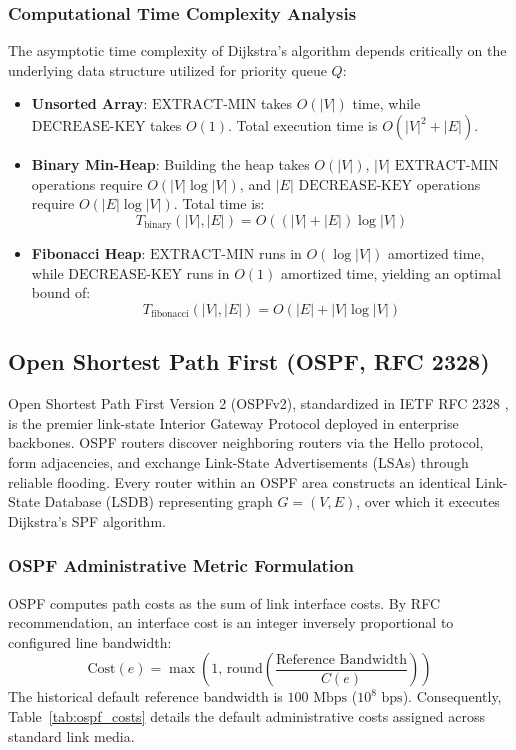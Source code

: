 \documentclass[12pt,a4paper,oneside]{report}
\begin{document}
\subsubsection{Computational Time Complexity Analysis}
The asymptotic time complexity of Dijkstra's algorithm depends critically on the underlying data structure utilized for priority queue $Q$:
\begin{itemize}
    \item \textbf{Unsorted Array}: $\text{EXTRACT-MIN}$ takes $O(|V|)$ time, while $\text{DECREASE-KEY}$ takes $O(1)$. Total execution time is $O(|V|^2 + |E|)$.
    \item \textbf{Binary Min-Heap}: Building the heap takes $O(|V|)$, $|V|$ $\text{EXTRACT-MIN}$ operations require $O(|V| \log |V|)$, and $|E|$ $\text{DECREASE-KEY}$ operations require $O(|E| \log |V|)$. Total time is:
    \begin{equation}
        T_{\text{binary}}(|V|, |E|) = O((|V| + |E|) \log |V|)
    \end{equation}
    \item \textbf{Fibonacci Heap}: $\text{EXTRACT-MIN}$ runs in $O(\log |V|)$ amortized time, while $\text{DECREASE-KEY}$ runs in $O(1)$ amortized time, yielding an optimal bound of:
    \begin{equation}
        T_{\text{fibonacci}}(|V|, |E|) = O(|E| + |V| \log |V|)
    \end{equation}
\end{itemize}

\subsection{Open Shortest Path First (OSPF, RFC 2328)}
Open Shortest Path First Version 2 (OSPFv2), standardized in IETF RFC 2328 \cite{moy1998ospf}, is the premier link-state Interior Gateway Protocol deployed in enterprise backbones. OSPF routers discover neighboring routers via the Hello protocol, form adjacencies, and exchange Link-State Advertisements (LSAs) through reliable flooding. Every router within an OSPF area constructs an identical Link-State Database (LSDB) representing graph $G = (V, E)$, over which it executes Dijkstra's SPF algorithm.

\subsubsection{OSPF Administrative Metric Formulation}
OSPF computes path costs as the sum of link interface costs. By RFC recommendation, an interface cost is an integer inversely proportional to configured line bandwidth:
\begin{equation}
    \text{Cost}(e) = \max\left(1, \, \text{round}\left( \frac{\text{Reference Bandwidth}}{C(e)} \right)\right)
    \label{eq:ospf_cost_formula}
\end{equation}
The historical default reference bandwidth is $100\text{ Mbps}$ ($10^8\text{ bps}$). Consequently, Table~\ref{tab:ospf_costs} details the default administrative costs assigned across standard link media.
\end{document}
